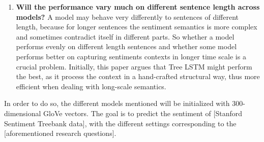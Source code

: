 \begin{enumerate}
    \item \textbf{Will the performance vary much on different sentence length across models?}
    A model may behave very differently to sentences of different length,
    because for longer sentences the sentiment semantics is more complex and
    sometimes contradict itself in different parts. So whether a model performs
    evenly on different length sentences and whether some model performs better
    on capturing sentiments contexts in longer time scale is a crucial problem.
    Initially, this paper argues that Tree LSTM might perform the best, as it
    process the context in a hand-crafted structural way, thus more efficient
    when dealing with long-scale semantics.
\end{enumerate}

In order to do so, the different models mentioned will be initialized with
300-dimensional GloVe\cite{pennington2014glove} vectors. The goal is to predict
the sentiment of [Stanford Sentiment Treebank data], with the different settings
corresponding to the [aforementioned research questions].

